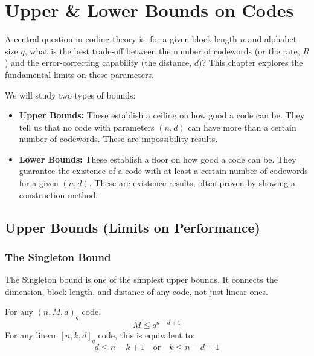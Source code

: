 \section{Upper \& Lower Bounds on Codes}

A central question in coding theory is: for a given block length $n$ and alphabet size $q$, what is the best trade-off between the number of codewords (or the rate, $R$) and the error-correcting capability (the distance, $d$)? This chapter explores the fundamental limits on these parameters.

We will study two types of bounds:
\begin{itemize}
    \item \textbf{Upper Bounds:} These establish a ceiling on how good a code can be. They tell us that no code with parameters $(n, d)$ can have more than a certain number of codewords. These are impossibility results.
    \item \textbf{Lower Bounds:} These establish a floor on how good a code can be. They guarantee the existence of a code with at least a certain number of codewords for a given $(n, d)$. These are existence results, often proven by showing a construction method.
\end{itemize}

\subsection{Upper Bounds (Limits on Performance)}

\subsubsection{The Singleton Bound}

The Singleton bound is one of the simplest upper bounds. It connects the dimension, block length, and distance of any code, not just linear ones.

\begin{theorem}
For any $(n, M, d)_q$ code,
\[ M \le q^{n-d+1} \]
For any linear $[n, k, d]_q$ code, this is equivalent to:
\[ d \le n - k + 1 \quad \text{or} \quad k \le n - d + 1 \]
\end{theorem}


